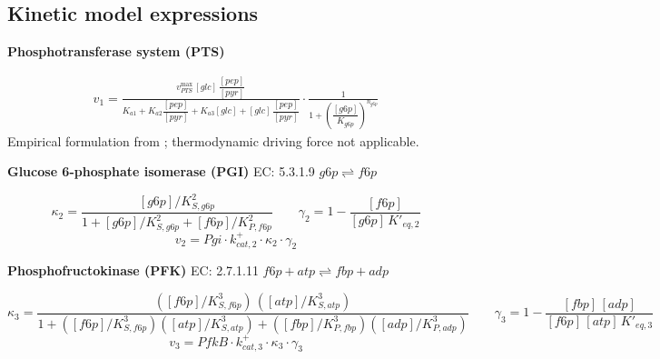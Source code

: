 \clearpage
\onecolumn
\supplementarysection
\providecommand{\SIdir}{supplementary/}

\subsection{Kinetic model expressions}\label{sec: kinetic expressions}



\textbf{Phosphotransferase system (PTS)}

\begin{align}
    v_1 =
    \frac{
        v^{\max}_{PTS}\,[glc]\,\dfrac{[pep]}{[pyr]}
    }{
        K_{a1} + K_{a2}\dfrac{[pep]}{[pyr]}
        + K_{a3}[glc]
        + [glc]\,\dfrac{[pep]}{[pyr]}
    }
    \cdot
    \frac{1}{1 + \left(\dfrac{[g6p]}{K_{g6p}}\right)^{n_{g6p}}}
    \label{eqn: PTS}
\end{align}
Empirical formulation from \textcite{Kadir2010ModelingsimulationmainmetabolismEscherichiacoliitsseveralsinglegeneknockoutmutantsexperimentalverification}; thermodynamic driving force not applicable.

\textbf{Glucose 6-phosphate isomerase (PGI)} \quad EC: 5.3.1.9 \quad $g6p \rightleftharpoons f6p$

\begin{equation}
    \kappa_2 = \frac{[g6p]/K_{S,g6p}^2}%
                    {1 + [g6p]/K_{S,g6p}^2 + [f6p]/K_{P,f6p}^2}
    \qquad
    \gamma_2 = 1 - \frac{[f6p]}{[g6p]\,K'_{eq,2}}
\end{equation}
\begin{equation}
    v_2 = Pgi \cdot k^+_{cat,2} \cdot \kappa_2 \cdot \gamma_2
    \label{eqn: pgi}
\end{equation}

\textbf{Phosphofructokinase (PFK)} \quad EC: 2.7.1.11 \quad $f6p + atp \rightleftharpoons fbp + adp$

\begin{equation}
    \kappa_3 = \frac{([f6p]/K_{S,f6p}^3)\,([atp]/K_{S,atp}^3)}%
                    {1 + ([f6p]/K_{S,f6p}^3)([atp]/K_{S,atp}^3) + ([fbp]/K_{P,fbp}^3)([adp]/K_{P,adp}^3)}
    \qquad
    \gamma_3 = 1 - \frac{[fbp]\,[adp]}{[f6p]\,[atp]\,K'_{eq,3}}
\end{equation}
\begin{equation}
    v_3 = PfkB \cdot k^+_{cat,3} \cdot \kappa_3 \cdot \gamma_3
    \label{eqn: pfk}
\end{equation}

